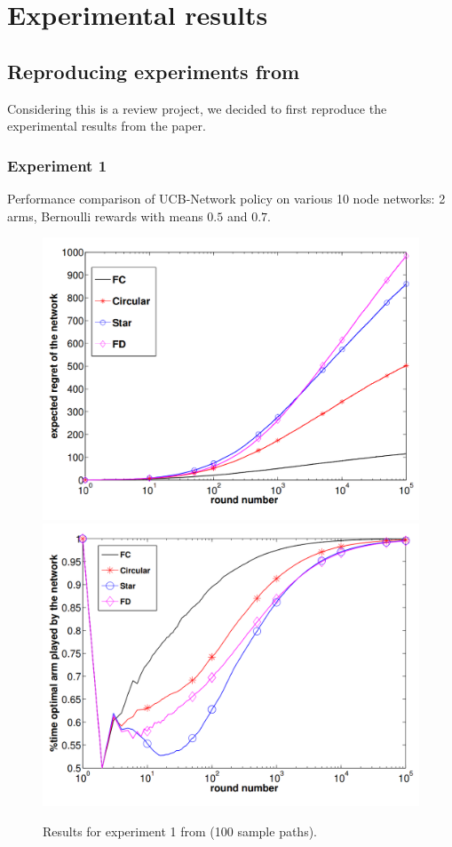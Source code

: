 \documentclass{article}
\begin{document}
\section{Experimental results}

\subsection{Reproducing experiments from \cite{DBLP:journals/corr/KollaJG16}}

Considering this is a review project, we decided to first reproduce the experimental results from the paper.

\subsubsection{Experiment 1}

Performance comparison of UCB-Network policy on various 10 node networks: 2 arms, Bernoulli rewards with means $0.5$ and $0.7$.

\begin{figure}[H]
  \centering
  \includegraphics[width=0.49\linewidth]{fig1_1.png}
  \includegraphics[width=0.49\linewidth]{fig1_2.png}
  \caption{Results for experiment 1 from \cite{DBLP:journals/corr/KollaJG16} (100 sample paths).}
\end{figure}
\end{document}
